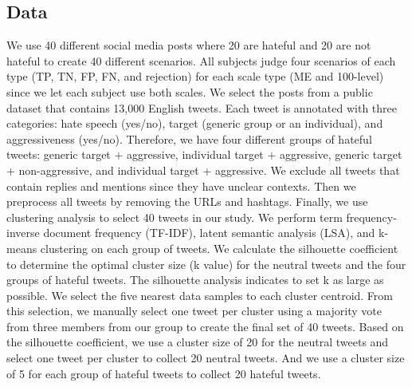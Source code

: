 \subsection{Data}
\label{sec:data}
We use 40 different social media posts where 20 are hateful and 20 are not hateful to create 40 different scenarios.
%
All subjects judge four scenarios of each type (TP, TN, FP, FN, and rejection) for each scale type (ME and 100-level) since we let each subject use both scales.
%
We select the posts from a public dataset \citep{basile2019semeval} that contains 13,000 English tweets.
%
Each tweet is annotated with three categories: hate speech (yes/no), target (generic group or an individual), and aggressiveness (yes/no).
%
Therefore, we have four different groups of hateful tweets: generic target + aggressive, individual target + aggressive, generic target + non-aggressive, and individual target + aggressive.
%
We exclude all tweets that contain replies and mentions since  they have unclear contexts.
%
Then we preprocess all tweets by removing the URLs and hashtags.
%
Finally, we use clustering analysis to select 40 tweets in our study.
%
We perform term frequency-inverse document frequency (TF-IDF), latent semantic analysis (LSA), and k-means clustering on each group of tweets.
%
We calculate the silhouette coefficient to determine the optimal cluster size (k value) for the neutral tweets and the four groups of hateful tweets.
%
The silhouette analysis indicates to set k as large as possible.
%
We select the five nearest data samples to each cluster centroid.
%
From this selection, we manually select one tweet per cluster using a majority vote from three members from our group to create the final set of 40 tweets.
%
Based on the silhouette coefficient, we use a cluster size of 20 for the neutral tweets and select one tweet per cluster to collect 20 neutral tweets.
%
And we use a cluster size of 5 for each group of hateful tweets to collect 20 hateful tweets.

